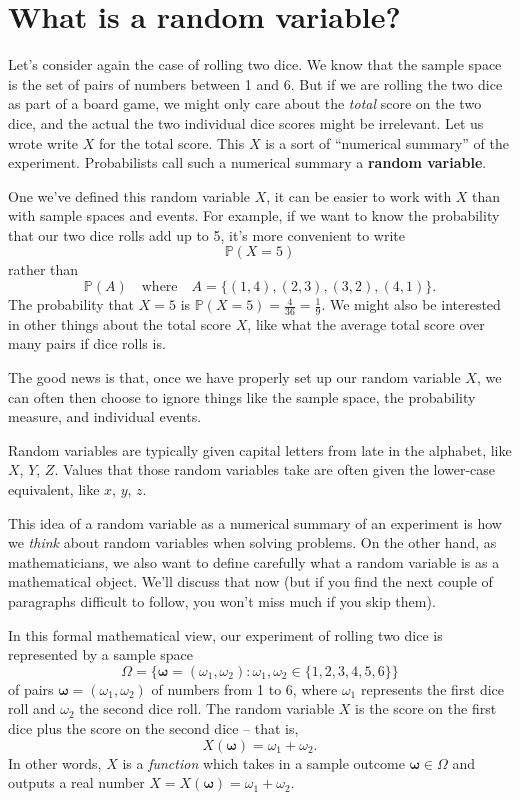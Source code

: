 \documentclass[
  a4paper,
]{book}
\theoremstyle{definition}
\theoremstyle{definition}
\theoremstyle{definition}
\theoremstyle{definition}
\theoremstyle{remark}
\begin{document}
\newcommand{\Range}{\operatorname{Range}}

\hypertarget{rv}{%
\section{What is a random variable?}\label{rv}}

Let's consider again the case of rolling two dice. We know that the sample space is the set of pairs of numbers between 1 and 6.
But if we are rolling the two dice as part of a board game, we might only care about the \emph{total} score on the two dice, and the actual the two individual dice scores might be irrelevant. Let us wrote write \(X\) for the total score. This \(X\) is a sort of ``numerical summary'' of the experiment. Probabilists call such a numerical summary a \textbf{random variable}.

One we've defined this random variable \(X\), it can be easier to work with \(X\) than with sample spaces and events. For example, if we want to know the probability that our two dice rolls add up to 5, it's more convenient to write
\[ \mathbb P(X = 5) \]
rather than
\[ \mathbb P(A) \quad \text{where} \quad A = \big\{ (1,4), (2,3), (3,2), (4,1) \big\} . \]
The probability that \(X = 5\) is \(\mathbb P(X = 5) = \frac{4}{36} = \frac{1}{9}\). We might also be interested in other things about the total score \(X\), like what the average total score over many pairs if dice rolls is.

The good news is that, once we have properly set up our random variable \(X\), we can often then choose to ignore things like the sample space, the probability measure, and individual events.

Random variables are typically given capital letters from late in the alphabet, like \(X\), \(Y\), \(Z\). Values that those random variables take are often given the lower-case equivalent, like \(x\), \(y\), \(z\).

This idea of a random variable as a numerical summary of an experiment is how we \emph{think} about random variables when solving problems. On the other hand, as mathematicians, we also want to define carefully what a random variable is as a mathematical object. We'll discuss that now (but if you find the next couple of paragraphs difficult to follow, you won't miss much if you skip them).

In this formal mathematical view, our experiment of rolling two dice is represented by a sample space
\[  \Omega = \big\{ \boldsymbol\omega = (\omega_1, \omega_2) : \omega_1, \omega_2 \in \{1,2,3,4,5,6\} \big\}  \]
of pairs \(\boldsymbol\omega = (\omega_1, \omega_2)\) of numbers from 1 to 6, where \(\omega_1\) represents the first dice roll and \(\omega_2\) the second dice roll.
The random variable \(X\) is the score on the first dice plus the score on the second dice -- that is,
\[ X(\boldsymbol\omega) = \omega_1 + \omega_2 . \]
In other words, \(X\) is a \emph{function} which takes in a sample outcome \(\boldsymbol\omega \in \Omega\) and outputs a real number \(X = X(\boldsymbol\omega) = \omega_1 + \omega_2\).
\end{document}
